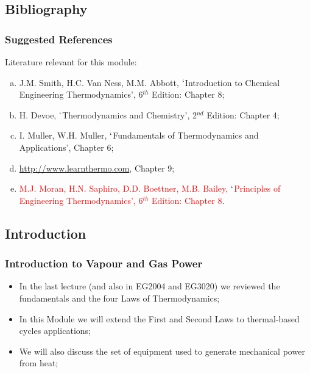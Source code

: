 \documentclass[10pt,compress]{beamer}
\begin{document}
\subsection{Bibliography} 
\begin{frame}
 \frametitle{Suggested References}
  Literature relevant for this module:
  \begin{enumerate}[(a)]
   \item J.M. Smith, H.C. Van Ness, M.M. Abbott, $\lq$Introduction to Chemical Engineering Thermodynamics', 6$^{th}$ Edition: Chapter 8;
   \item H. Devoe, $\lq$Thermodynamics and Chemistry', 2$^{nd}$ Edition: Chapter 4;
   \item I. Muller, W.H. Muller, $\lq$Fundamentals of Thermodynamics and Applications', Chapter 6;
   \item \href{http://www.learnthermo.com}{http://www.learnthermo.com}, Chapter 9;
   \item \textcolor{red}{M.J. Moran, H.N. Saphiro, D.D. Boettner, M.B. Bailey, $\lq$Principles of Engineering Thermodynamics', 6$^{th}$ Edition: Chapter 8}.
  \end{enumerate}
\end{frame}


\subsection{Introduction}
\begin{frame}
 \frametitle{Introduction to Vapour and Gas Power}
 \begin{block}{} 
  \begin{itemize}
   \item <1-> In the last lecture (and also in EG2004 and EG3020) we reviewed the fundamentals and the four Laws of Thermodynamics;
   \item <2-> In this Module we will extend the First and Second Laws to thermal-based cycles applications; 
   \item <3-> We will also discuss the set of equipment used to generate mechanical power from heat;
  \end{itemize}
 \end{block}  
\end{frame}
\end{document}
